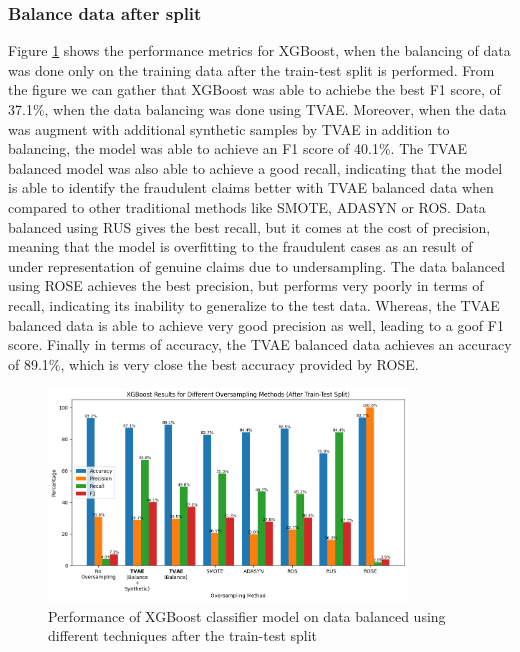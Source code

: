 \documentclass[twoside,11pt]{article}
\begin{document}
\begin{keywords}
\subsubsection{Balance data after split} \label{sec:afterSplit}
Figure \ref{fig:xgboost_oversample_after_split} shows the performance metrics for XGBoost, when the balancing of data was done only on the training data after the train-test split is performed. From the figure we can gather that XGBoost was able to achiebe the best F1 score, of 37.1\%, when the data balancing was done using TVAE. Moreover, when the data was augment with additional synthetic samples by TVAE in addition to balancing, the model was able to achieve an F1 score of 40.1\%. The TVAE balanced model was also able to achieve a good recall, indicating that the model is able to identify the fraudulent claims better with TVAE balanced data when compared to other traditional methods like SMOTE, ADASYN or ROS. Data balanced using RUS gives the best recall, but it comes at the cost of precision, meaning that the model is overfitting to the fraudulent cases as an result of under representation of genuine claims due to undersampling.  The data balanced using ROSE achieves the best precision, but performs very poorly in terms of recall, indicating its inability to generalize to the test data. Whereas, the TVAE balanced data is able to achieve very good precision as well, leading to a goof F1 score. Finally in terms of accuracy, the TVAE balanced data achieves an accuracy of 89.1\%, which is very close the best accuracy provided by ROSE.
\begin{figure}
  \centering
  \includegraphics[width=0.85\textwidth]{images/xgboost_oversample_after_split.png}
  \caption{Performance of XGBoost classifier model on data balanced using different techniques after the train-test split}
  \label{fig:xgboost_oversample_after_split}
\end{figure}

\end{keywords}
\end{document}
